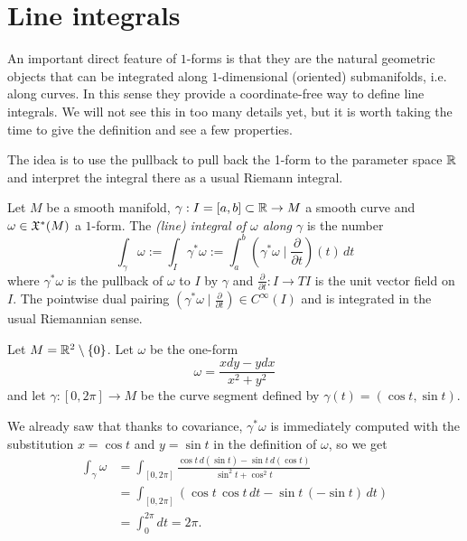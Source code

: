 \section{Line integrals}

An important direct feature of $1$-forms is that they are the natural geometric objects that can be integrated along $1$-dimensional (oriented) submanifolds, i.e. along curves.
In this sense they provide a coordinate-free way to define line integrals.
We will not see this in too many details yet, but it is worth taking the time to give the definition and see a few properties.

The idea is to use the pullback to pull back the 1-form to the parameter space $\mathbb{R}$ and interpret the integral there as a usual Riemann integral.

\begin{definition}
	Let $M$ be a smooth manifold, $\gamma: I = [a,b]\subset \mathbb{R} \to M$ a smooth curve and $\omega\in\mathfrak{X}^*(M)$ a $1$-form.
	The \emph{(line) integral of $\omega$ along $\gamma$} is the number
	\begin{equation}
		\int_\gamma \omega :=
		\int_I \gamma^*\omega :=
		\int_a^b \left(\gamma^*\omega \mid \frac{\partial}{\partial t}\right)(t)\, dt
	\end{equation}
	where $\gamma^*\omega$ is the pullback of $\omega$ to $I$ by $\gamma$ and $\frac{\partial}{\partial t}: I \to TI$ is the unit vector field on $I$.
	The pointwise dual pairing $\left(\gamma^*\omega \mid \frac{\partial}{\partial t}\right)\in C^\infty(I)$ and is integrated in the usual Riemannian sense.
\end{definition}

\begin{example}\label{ex:li}
	Let $M=\mathbb{R}^2\setminus\{0\}$. Let $\omega$ be the one-form
	\begin{equation}
		\omega = \frac{x dy - y dx}{x^2 + y^2}
	\end{equation}
	and let $\gamma:[0,2\pi]\to M$ be the curve segment defined by $\gamma(t) = (\cos t, \sin t)$.

	We already saw that thanks to covariance, $\gamma^*\omega$ is immediately computed with the substitution $x=\cos t$ and $y=\sin t$ in the definition of $\omega$, so we get
	\begin{align}
		\int_\gamma \omega
		 & = \int_{[0,2\pi]} \frac{\cos t\, d(\sin t) - \sin t \, d(\cos t)}{\sin^2 t + \cos^2 t} \\
		 & = \int_{[0,2\pi]} (\cos t\, \cos t\, dt - \sin t \, (-\sin t)\, dt)                    \\
		 & = \int_0^{2\pi} dt = 2\pi.
	\end{align}
\end{example}

